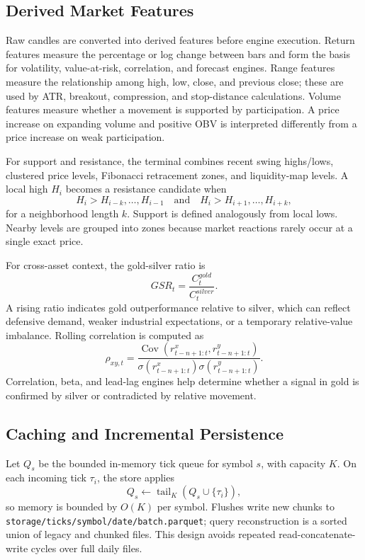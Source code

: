 \documentclass[conference]{IEEEtran}
\begin{document}
\subsection{Derived Market Features}

Raw candles are converted into derived features before engine execution.
Return features measure the percentage or log change between bars and form
the basis for volatility, value-at-risk, correlation, and forecast engines.
Range features measure the relationship among high, low, close, and previous
close; these are used by ATR, breakout, compression, and stop-distance
calculations. Volume features measure whether a movement is supported by
participation. A price increase on expanding volume and positive OBV is
interpreted differently from a price increase on weak participation.

For support and resistance, the terminal combines recent swing highs/lows,
clustered price levels, Fibonacci retracement zones, and liquidity-map
levels. A local high $H_i$ becomes a resistance candidate when
\begin{equation}
H_i > H_{i-k},\ldots,H_{i-1}
\quad \text{and} \quad
H_i > H_{i+1},\ldots,H_{i+k},
\end{equation}
for a neighborhood length $k$. Support is defined analogously from local
lows. Nearby levels are grouped into zones because market reactions rarely
occur at a single exact price.

For cross-asset context, the gold-silver ratio is
\begin{equation}
GSR_t = \frac{C_t^{gold}}{C_t^{silver}}.
\end{equation}
A rising ratio indicates gold outperformance relative to silver, which can
reflect defensive demand, weaker industrial expectations, or a temporary
relative-value imbalance. Rolling correlation is computed as
\begin{equation}
\rho_{xy,t} =
\frac{\operatorname{Cov}(r^x_{t-n+1:t}, r^y_{t-n+1:t})}
{\sigma(r^x_{t-n+1:t})\sigma(r^y_{t-n+1:t})}.
\end{equation}
Correlation, beta, and lead-lag engines help determine whether a signal in
gold is confirmed by silver or contradicted by relative movement.

\subsection{Caching and Incremental Persistence}

Let $Q_s$ be the bounded in-memory tick queue for symbol $s$, with capacity
$K$. On each incoming tick $\tau_i$, the store applies
\begin{equation}
Q_s \leftarrow \operatorname{tail}_K(Q_s \cup \{\tau_i\}),
\end{equation}
so memory is bounded by $O(K)$ per symbol. Flushes write new chunks to
\texttt{storage/ticks/symbol/date/batch.parquet}; query reconstruction is a
sorted union of legacy and chunked files. This design avoids repeated
read-concatenate-write cycles over full daily files.
\end{document}
